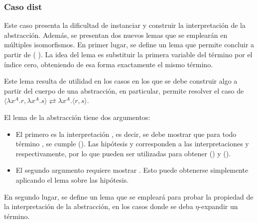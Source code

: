 
\subsubsection{Caso dist}

Este caso presenta la dificultad de instanciar y construir la interpretación de la abstracción.
Además, se presentan dos nuevos lemas que se emplearán en múltiples isomorfismos.
En primer lugar, se define un lema que permite concluir \snstar{} a partir de \snstar ( ).
La idea del lema es substituir la primera variable del término por el índice cero, obteniendo de esa forma exactamente el mismo término.


Este lema resulta de utilidad en los casos en los que se debe construir algo a partir del cuerpo de una abstracción, en particular, permite resolver el caso de  $\langle \lambda x^A.r, \lambda x^A.s \rangle \rightleftarrows \lambda x^A. \langle r,s \rangle$.


\newcommand{\substu}{\subst{\cons{\bound{u}}{\parens{\comp{\ids}{\bound{$\rho$}}}}}}

El lema de la abstracción tiene dos argumentos:
\begin{itemize}
	\item El primero es la interpretación , es decir, se debe mostrar que para todo término \snstar {}, se cumple \snstar (\pair{\substu\bound{r}}{\substu\bound{s}}).
	Las hipótesis  y  corresponden a las interpretaciones  y  respectivamente, por lo que pueden ser utilizadas para obtener \snstar(\substu{}) y \snstar(\substu{}).
	\item El segundo argumento requiere mostrar \snstar{}.
	Esto puede obtenerse simplemente aplicando el lema  sobre las hipótesis.
\end{itemize}

En segundo lugar, se define un lema que se empleará para probar la propiedad de la interpretación de la abstracción, en los casos donde se deba $\eta$-expandir un término.

